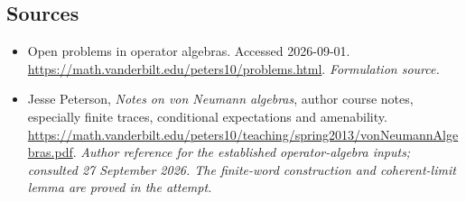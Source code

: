 \documentclass[11pt]{article}
\begin{document}
\subsection{Sources}
\begin{itemize}
\item[S1]Open problems in operator algebras. Accessed 2026-09-01.
\url{https://math.vanderbilt.edu/peters10/problems.html}.
\textit{Formulation source.}
\item[E1]Jesse Peterson, \emph{Notes on von Neumann algebras}, author course notes, especially finite traces, conditional expectations and amenability.
\url{https://math.vanderbilt.edu/peters10/teaching/spring2013/vonNeumannAlgebras.pdf}.
\textit{Author reference for the established operator-algebra inputs; consulted 27 September 2026. The finite-word construction and coherent-limit lemma are proved in the attempt.}
\end{itemize}
\end{document}
